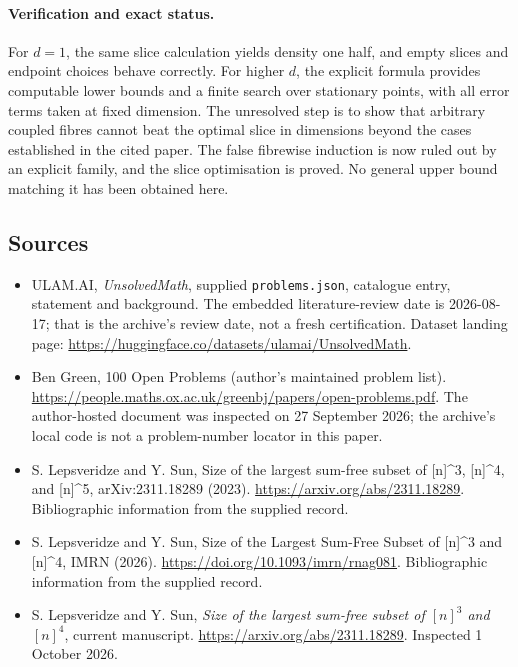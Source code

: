 \documentclass[11pt,a4paper]{article}
\begin{document}
\paragraph{Verification and exact status.}
For $d=1$, the same slice calculation yields density one half, and empty slices and endpoint choices behave correctly. For higher $d$, the explicit formula provides computable lower bounds and a finite search over stationary points, with all error terms taken at fixed dimension. The unresolved step is to show that arbitrary coupled fibres cannot beat the optimal slice in dimensions beyond the cases established in the cited paper. The false fibrewise induction is now ruled out by an explicit family, and the slice optimisation is proved. No general upper bound matching it has been obtained here.

\subsection{Sources}

{\small

\begin{itemize}

\item[\hypertarget{source:statement:1}{S1}] ULAM.AI, \emph{UnsolvedMath}, supplied \texttt{problems.json}, catalogue entry, statement and background. The embedded literature-review date is 2026-08-17; that is the archive’s review date, not a fresh certification. Dataset landing page: \url{https://huggingface.co/datasets/ulamai/UnsolvedMath}.

\item[\hypertarget{source:statement:2}{S2}] Ben Green, 100 Open Problems (author’s maintained problem list). \url{https://people.maths.ox.ac.uk/greenbj/papers/open-problems.pdf}. The author-hosted document was inspected on 27 September 2026; the archive’s local code is not a problem-number locator in this paper.

\item[\hypertarget{source:statement:3}{S3}] S. Lepsveridze and Y. Sun, Size of the largest sum-free subset of [n]\textasciicircum{}3, [n]\textasciicircum{}4, and [n]\textasciicircum{}5, arXiv:2311.18289 (2023). \url{https://arxiv.org/abs/2311.18289}. Bibliographic information from the supplied record.

\item[\hypertarget{source:statement:4}{S4}] S. Lepsveridze and Y. Sun, Size of the Largest Sum-Free Subset of [n]\textasciicircum{}3 and [n]\textasciicircum{}4, IMRN (2026). \url{https://doi.org/10.1093/imrn/rnag081}. Bibliographic information from the supplied record.

\item[E1] S. Lepsveridze and Y. Sun, \emph{Size of the largest sum-free subset of $[n]^3$ and $[n]^4$}, current manuscript. \url{https://arxiv.org/abs/2311.18289}. Inspected 1 October 2026.

\end{itemize}

}

\label{end:statement}
\end{document}

